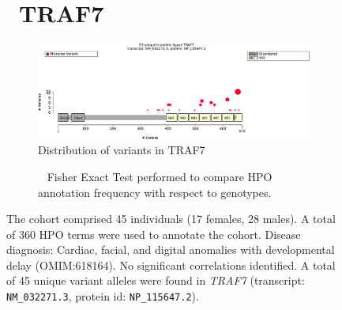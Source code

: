 \begin{figure}[htbp]
\section*{ TRAF7}
\centering
\begin{subfigure}[b]{0.95\textwidth}
\centering
\includegraphics[width=\textwidth]{ img/TRAF7_protein_diagram.pdf} 
\captionsetup{justification=raggedright,singlelinecheck=false}
\caption{Distribution of variants in TRAF7}
\end{subfigure}

\vspace{2em}

\begin{subfigure}[b]{0.95\textwidth}
\centering
{}
\captionsetup{justification=raggedright,singlelinecheck=false}
\caption{             Fisher Exact Test performed to compare HPO annotation frequency with respect to genotypes. }
\end{subfigure}

\vspace{2em}

\caption{ The cohort comprised 45 individuals (17 females, 28 males). A total of 360 HPO terms were used to annotate the cohort. Disease diagnosis: Cardiac, facial, and digital anomalies with developmental delay (OMIM:618164). No significant correlations identified. A total of 45 unique variant alleles were found in \textit{TRAF7} (transcript: \texttt{NM\_032271.3}, protein id: \texttt{NP\_115647.2}).}
\end{figure}
